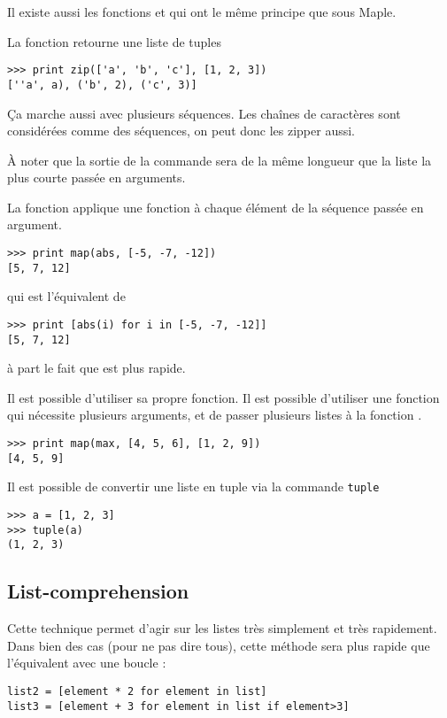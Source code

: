 \documentclass[a4paper,twoside]{article}
\begin{document}
\bigskip

Il existe aussi les fonctions  et  qui ont le même principe que sous Maple.

La fonction  retourne une liste de tuples
\begin{verbatim}
>>> print zip(['a', 'b', 'c'], [1, 2, 3])
[''a', a), ('b', 2), ('c', 3)]
\end{verbatim}

\begin{remarque}
Ça marche aussi avec plusieurs séquences. Les chaînes de caractères sont considérées comme des séquences, on peut donc les zipper aussi.

À noter que la sortie de la commande sera de la même longueur que la liste la plus courte passée en arguments.
\end{remarque}

La fonction  applique une fonction à chaque élément de la séquence passée en argument.

\begin{verbatim}
>>> print map(abs, [-5, -7, -12])
[5, 7, 12]
\end{verbatim}
qui est l'équivalent de
\begin{verbatim}
>>> print [abs(i) for i in [-5, -7, -12]]
[5, 7, 12]
\end{verbatim}
à part le fait que  est plus rapide.

Il est possible d'utiliser sa propre fonction. Il est possible d'utiliser une fonction qui nécessite plusieurs arguments, et de passer plusieurs listes à la fonction .
\begin{verbatim}
>>> print map(max, [4, 5, 6], [1, 2, 9])
[4, 5, 9]
\end{verbatim}

\bigskip

Il est possible de convertir une liste en tuple via la commande \texttt{tuple}
\begin{verbatim}
>>> a = [1, 2, 3]
>>> tuple(a)
(1, 2, 3)
\end{verbatim}


\subsection{List-comprehension}
Cette technique permet d'agir sur les listes très simplement et très rapidement. Dans bien des cas (pour ne pas dire tous), cette méthode sera plus rapide que l'équivalent avec une boucle :
\begin{verbatim}
list2 = [element * 2 for element in list]
list3 = [element + 3 for element in list if element>3]
\end{verbatim}
\end{document}
